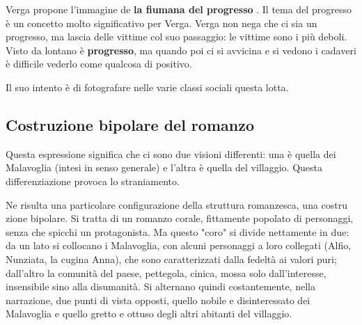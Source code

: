 \documentclass{book}
\newcommand{\evidenziatore}[1]{\textbf{#1}}
\begin{document}
Verga propone l'immagine de \evidenziatore{la fiumana del progresso} .
Il tema del progresso è un concetto molto significativo per Verga. Verga
non nega che ci sia un progresso, ma lascia delle vittime col suo
passaggio: le vittime sono i più deboli. Visto da lontano è
\textbf{progresso}, ma quando poi ci si avvicina e si vedono i cadaveri
è difficile vederlo come qualcosa di positivo.

Il suo intento è di fotografare nelle varie classi sociali questa lotta.

\subsection{Costruzione bipolare del romanzo}

Questa espressione significa che ci sono due visioni differenti: una è
quella dei Malavoglia (intesi in senso generale) e l'altra è quella del
villaggio. Questa differenziazione provoca lo straniamento.

Ne risulta una particolare configurazione della struttura romanzesca, una costru zione bipolare. Si tratta di un romanzo corale, fittamente popolato di personaggi, senza che spicchi un protagonista. Ma questo "coro" si divide nettamente in due: da un lato si collocano i Malavoglia, con alcuni personaggi a loro collegati (Alfio, Nunziata, la cugina Anna), che sono caratterizzati dalla fedeltà ai valori puri; dall'altro la comunità del paese, pettegola, cinica, mossa solo dall'interesse, insensibile sino alla disumanità. Si alternano quindi costantemente, nella narrazione, due punti di vista opposti, quello nobile e disinteressato dei Malavoglia e quello gretto e ottuso degli altri abitanti del villaggio.
\end{document}
